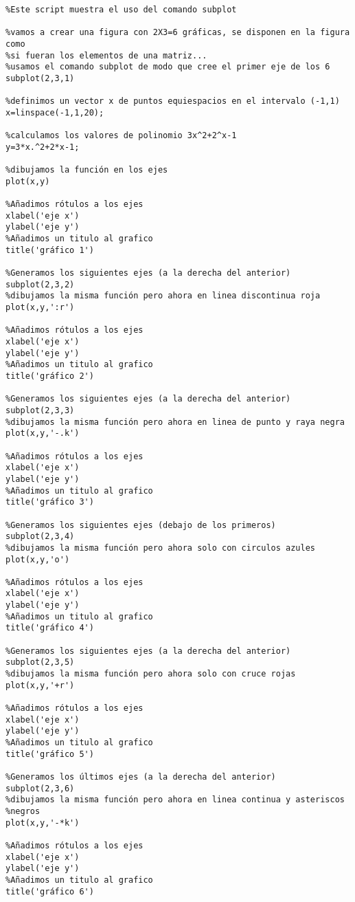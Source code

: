 \begin{verbatim}
%Este script muestra el uso del comando subplot

%vamos a crear una figura con 2X3=6 gráficas, se disponen en la figura como
%si fueran los elementos de una matriz...
%usamos el comando subplot de modo que cree el primer eje de los 6
subplot(2,3,1)

%definimos un vector x de puntos equiespacios en el intervalo (-1,1)
x=linspace(-1,1,20);

%calculamos los valores de polinomio 3x^2+2^x-1
y=3*x.^2+2*x-1;

%dibujamos la función en los ejes
plot(x,y)

%Añadimos rótulos a los ejes
xlabel('eje x')
ylabel('eje y')
%Añadimos un titulo al grafico
title('gráfico 1')

%Generamos los siguientes ejes (a la derecha del anterior)
subplot(2,3,2)
%dibujamos la misma función pero ahora en linea discontinua roja
plot(x,y,':r')

%Añadimos rótulos a los ejes
xlabel('eje x')
ylabel('eje y')
%Añadimos un titulo al grafico
title('gráfico 2')

%Generamos los siguientes ejes (a la derecha del anterior)
subplot(2,3,3)
%dibujamos la misma función pero ahora en linea de punto y raya negra
plot(x,y,'-.k')

%Añadimos rótulos a los ejes
xlabel('eje x')
ylabel('eje y')
%Añadimos un titulo al grafico
title('gráfico 3')

%Generamos los siguientes ejes (debajo de los primeros)
subplot(2,3,4)
%dibujamos la misma función pero ahora solo con circulos azules
plot(x,y,'o')

%Añadimos rótulos a los ejes
xlabel('eje x')
ylabel('eje y')
%Añadimos un titulo al grafico
title('gráfico 4')

%Generamos los siguientes ejes (a la derecha del anterior)
subplot(2,3,5)
%dibujamos la misma función pero ahora solo con cruce rojas
plot(x,y,'+r')

%Añadimos rótulos a los ejes
xlabel('eje x')
ylabel('eje y')
%Añadimos un titulo al grafico
title('gráfico 5')

%Generamos los últimos ejes (a la derecha del anterior)
subplot(2,3,6)
%dibujamos la misma función pero ahora en linea continua y asteriscos
%negros
plot(x,y,'-*k')

%Añadimos rótulos a los ejes
xlabel('eje x')
ylabel('eje y')
%Añadimos un titulo al grafico
title('gráfico 6')
\end{verbatim}

